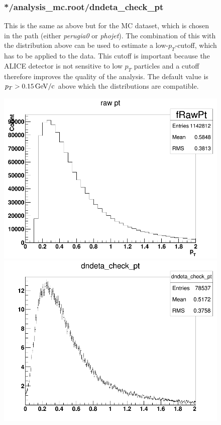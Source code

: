 \documentclass{article}
\begin{document}
\begin{figure}[H]
\begin{minipage}[b]{0.55\textwidth}
\subsubsection*{*/analysis\_mc.root/dndeta\_check\_pt}
This is the same as above but for the MC dataset, which is chosen in the path (either \textit{perugia0} or \textit{phojet}). The combination of this with the distribution above can be used to estimate a low-$p_{T}$-cutoff, which has to be applied to the data. This cutoff is important because the ALICE detector is not sensitive to low $p_{T}$ particles and a cutoff therefore improves the quality of the analysis. The default value is $p_{T} > \unit[0.15]{GeV/c}$ above which the distributions are compatible.\\
\end{minipage}
\begin{minipage}[b]{0.45\textwidth}
\centering
\includegraphics[width=\textwidth]{images/fRawPt.png}
\includegraphics[width=\textwidth]{images/dndeta_check_pt.png}
\vspace{\baselineskip}
\end{minipage}
\end{figure}
\end{document}

